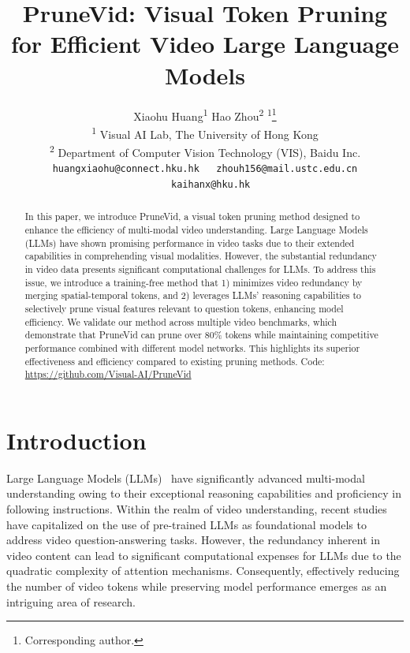\documentclass{article} %
\title{
  PruneVid: Visual Token Pruning for Efficient Video Large Language Models
}
\author{{Xiaohu Huang}\textsuperscript{1}\qquad\qquad
{Hao Zhou}\textsuperscript{2} \qquad\qquad {Kai Han}\textsuperscript{1}\thanks{Corresponding author.}\\
\textsuperscript{1} Visual AI Lab, The University of Hong Kong \\
\textsuperscript{2} Department of Computer Vision Technology (VIS), Baidu Inc. \\
{\tt\small huangxiaohu@connect.hku.hk \ \  zhouh156@mail.ustc.edu.cn \ \  kaihanx@hku.hk}
}
\begin{document}
\maketitle

\begin{abstract}

In this paper, we introduce PruneVid, a visual token pruning method designed to enhance the efficiency of multi-modal video understanding. Large Language Models (LLMs) have shown promising performance in video tasks due to their extended capabilities in comprehending visual modalities. However, the substantial redundancy in video data presents significant computational challenges for LLMs. To address this issue, we introduce a training-free method that 1) minimizes video redundancy by merging spatial-temporal tokens, and 2) leverages LLMs’ reasoning capabilities to selectively prune visual features relevant to question tokens, enhancing model efficiency. We validate our method across multiple video benchmarks, which demonstrate that PruneVid can prune over 80\% tokens while maintaining competitive performance combined with different model networks. This highlights its superior effectiveness and efficiency compared to existing pruning methods. Code: \url{https://github.com/Visual-AI/PruneVid}

\end{abstract}

\section{Introduction}
\label{sec:intro}
Large Language Models (LLMs)~\citep{gpt4,qwen, llama} have significantly advanced multi-modal understanding owing to their exceptional reasoning capabilities and proficiency in following instructions. Within the realm of video understanding, recent studies~\citep{llama-vid, videollava, videollama, videochat2, videochat, pllava, tarsier} have capitalized on the use of pre-trained LLMs as foundational models to address video question-answering tasks. However, the redundancy inherent in video content can lead to significant computational expenses for LLMs due to the quadratic complexity of attention mechanisms.  Consequently, effectively reducing the number of video tokens while preserving model performance emerges as an intriguing area of research.
\end{document}
